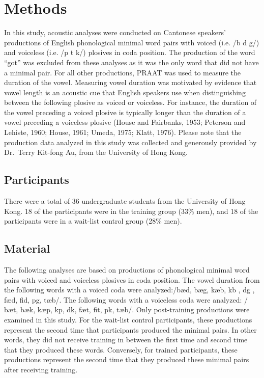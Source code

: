 \documentclass[man]{apa6}
\theoremstyle{definition}
\theoremstyle{definition}
\theoremstyle{definition}
\theoremstyle{remark}
\begin{document}
\section{Methods}\label{methods}

In this study, acoustic analyses were conducted on Cantonese speakers'
productions of English phonological minimal word pairs with voiced (i.e.
/b d g/) and voiceless (i.e. /p t k/) plosives in coda position. The
production of the word \enquote{got} was excluded from these analyses as
it was the only word that did not have a minimal pair. For all other
productions, PRAAT was used to measure the duration of the vowel.
Measuring vowel duration was motivated by evidence that vowel length is
an acoustic cue that English speakers use when distinguishing between
the following plosive as voiced or voiceless. For instance, the duration
of the vowel preceding a voiced plosive is typically longer than the
duration of a vowel preceding a voiceless plosive (House and Fairbanks,
1953; Peterson and Lehiste, 1960; House, 1961; Umeda, 1975; Klatt,
1976). Please note that the production data analyzed in this study was
collected and generously provided by Dr.~Terry Kit-fong Au, from the
University of Hong Kong.

\subsection{Participants}\label{participants}

There were a total of 36 undergraduate students from the University of
Hong Kong. 18 of the participants were in the training group (33\% men),
and 18 of the participants were in a wait-list control group (28\% men).

\subsection{Material}\label{material}

The following analyses are based on productions of phonological minimal
word pairs with voiced and voiceless plosives in coda position. The
vowel duration from the following words with a voiced coda were
analyzed:/b\ae d, bæg, k\ae b, k\textturnv b , d\textopeno g , f\ae d,
fid, p\textsci g, t\ae b/. The following words with a voiceless coda
were analyzed: / b\ae t, b\ae k, k\ae p, k\textturnv p, d\textscripta k,
f\ae t, fit, p\textsci k, t\ae b/. Only post-training productions were
examined in this study. For the wait-list control participants, these
productions represent the second time that participants produced the
minimal pairs. In other words, they did not receive training in between
the first time and second time that they produced these words.
Conversely, for trained participants, these productions represent the
second time that they produced these minimal pairs after receiving
training.
\end{document}
